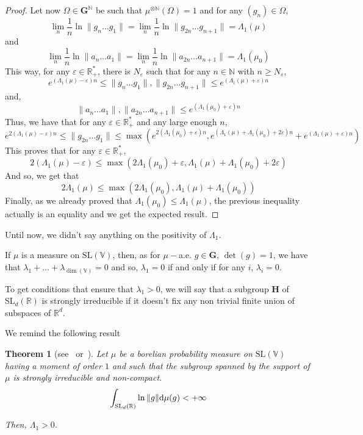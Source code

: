\documentclass[11pt]{amsart}
\newtheorem{theorem}{Theorem}[section]
\theoremstyle{definition}
\theoremstyle{remark}
\numberwithin{equation}{section}
\begin{document}
\begin{proof}
Let now $\Omega \in {\mathbf G}^{\mathbb N}$ be such that $\mu^{\otimes {\mathbb N}} (\Omega)=1$ and for any $(g_n) \in \Omega$,
\[
\lim_n \frac 1 n \ln \|g_{n} \dots g_1 \| =\lim_n \frac 1 n \ln \|g_{2n} \dots g_{n+1}\| = \Lambda_1(\mu)
\]
and
\[
\lim_n\frac 1 n \ln \|a_{n} \dots a_1 \| = \lim_n \frac 1n \ln \|a_{2n} \dots a_{n+1}\| = \Lambda_1(\mu_0)
\]
This way, for any $\varepsilon \in {\mathbb R}_+^\ast$, there is $N_\varepsilon$ such that for any $n\in {\mathbb N}$ with $n\geqslant N_\varepsilon$,
\[
e^{(\Lambda_1(\mu) - \varepsilon)n} \leqslant\|g_n \dots g_1 \| , \|g_{2n} \dots g_{n+1} \| \leqslant e^{(\Lambda_1(\mu) + \varepsilon)n}
\]
and,
\[\|a_n \dots a_1 \|, \|a_{2n} \dots a_{n+1} \| \leqslant e^{(\Lambda_1(\mu_0) + \varepsilon)n}
\]
Thus, we have that for any $\varepsilon\in {\mathbb R}_+^\ast$ and any large enough $n$,
\[
e^{2 (\Lambda_1(\mu)-\varepsilon)n} \leqslant \|g_{2n} \dots g_1 \| \leqslant \max\left( e^{2(\Lambda_1(\mu_0) + \varepsilon)n}, e^{(\Lambda_1(\mu) + \Lambda_1(\mu_0) + 2\varepsilon)n} + e^{(\Lambda_1(\mu) + \varepsilon)n} \right)
\]
This proves that for any $\varepsilon \in {\mathbb R}_+^\ast$,
\[
2(\Lambda_1(\mu) - \varepsilon) \leqslant \max (2\Lambda_1(\mu_0) + \varepsilon, \Lambda_1(\mu) + \Lambda_1(\mu_0) + 2\varepsilon)
\]
And so, we get that
\[
2\Lambda_1(\mu) \leqslant \max( 2\Lambda_1(\mu_0), \Lambda_1(\mu) + \Lambda_1(\mu_0))
\]
Finally, as we already proved that $\Lambda_1(\mu_0) \leqslant \Lambda_1(\mu)$, the previous inequality actually is an equality and we get the expected result.
\end{proof}

Until now, we didn't say anything on the positivity of $\Lambda_1$.

If $\mu$ is a measure on $\mathrm{SL}({\mathbb V})$, then, as for $\mu-$a.e. $g\in {\mathbf G}$, $\det(g)=1$, we have that $\lambda_1 + \dots + \lambda_{\dim({\mathbb V})} = 0$ and so, $\lambda_1=0$ if and only if for any $i$, $\lambda_i=0$.

To get conditions that ensure that $\lambda_1>0$, we will say that a subgroup ${\mathbf H}$ of $\mathrm{SL}_d({\mathbb R})$ is strongly irreducible if it doesn't fix any non trivial finite union of subspaces of ${\mathbb R}^d$.

We remind the following result
\begin{theorem}[see~\cite{BL85} or~\cite{Gu81}] \label{theorem:positivite_Lyapunov}
Let $\mu$ be a borelian probability measure on $\mathrm{SL}({\mathbb V})$ having a moment of order $1$ and such that the subgroup spanned by the support of $\mu$ is strongly irreducible and non-compact.
\[
\int_{\mathrm{SL}_d({\mathbb R})} \ln \|g\|{{\rm d}}\mu(g) <+\infty
\]

Then, $\Lambda_1 >0$.  
\end{theorem}
\end{document}
